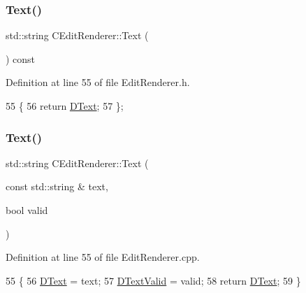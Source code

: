 \subsubsection{\texorpdfstring{Text()}{Text()}\hspace{0.1cm}{\footnotesize\ttfamily [1/2]}}
{\footnotesize\ttfamily std\+::string C\+Edit\+Renderer\+::\+Text (\begin{DoxyParamCaption}{ }\end{DoxyParamCaption}) const\hspace{0.3cm}{\ttfamily [inline]}}



Definition at line 55 of file Edit\+Renderer.\+h.


\begin{DoxyCode}
55                               \{
56             \textcolor{keywordflow}{return} \hyperlink{classCEditRenderer_af79bf047383c610d4fc24d937e29c594}{DText};   
57         \};
\end{DoxyCode}
\hypertarget{classCEditRenderer_aaf22d741a35786d3b667eca90c25d1f4}{}\label{classCEditRenderer_aaf22d741a35786d3b667eca90c25d1f4} 
\subsubsection{\texorpdfstring{Text()}{Text()}\hspace{0.1cm}{\footnotesize\ttfamily [2/2]}}
{\footnotesize\ttfamily std\+::string C\+Edit\+Renderer\+::\+Text (\begin{DoxyParamCaption}\item[{const std\+::string \&}]{text,  }\item[{bool}]{valid }\end{DoxyParamCaption})}



Definition at line 55 of file Edit\+Renderer.\+cpp.


\begin{DoxyCode}
55                                                               \{
56     \hyperlink{classCEditRenderer_af79bf047383c610d4fc24d937e29c594}{DText} = text;
57     \hyperlink{classCEditRenderer_ab4f0c6b356170adad1ad3b3e16573966}{DTextValid} = valid;
58     \textcolor{keywordflow}{return} \hyperlink{classCEditRenderer_af79bf047383c610d4fc24d937e29c594}{DText};
59 \}
\end{DoxyCode}
\hypertarget{classCEditRenderer_a9d93896dd7d4a279e8a957627679a511}{}\label{classCEditRenderer_a9d93896dd7d4a279e8a957627679a511} 
